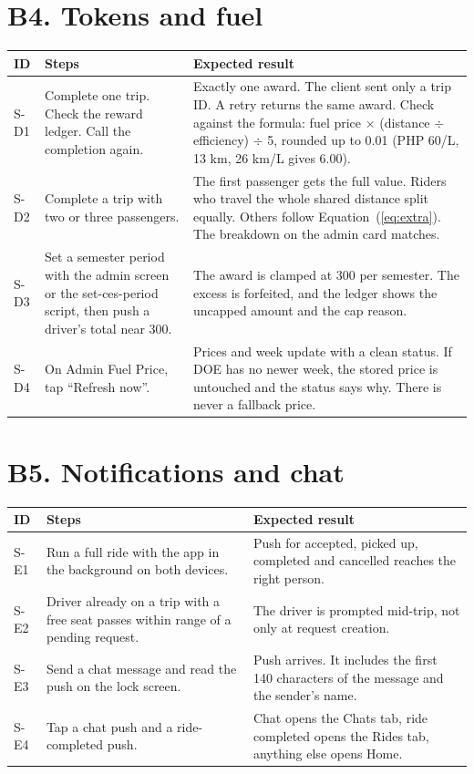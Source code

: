 \section*{B4. Tokens and fuel}
\small
\begin{longtable}{|p{1.1cm}|p{6.6cm}|p{6.3cm}|}
\hline
\textbf{ID} & \textbf{Steps} & \textbf{Expected result} \\
\hline
\endhead
S-D1 & Complete one trip. Check the reward ledger. Call the completion again. & Exactly one award. The client sent only a trip ID. A retry returns the same award. Check against the formula: fuel price $\times$ (distance $\div$ efficiency) $\div$ 5, rounded up to 0.01 (PHP 60/L, 13 km, 26 km/L gives 6.00). \\
\hline
S-D2 & Complete a trip with two or three passengers. & The first passenger gets the full value. Riders who travel the whole shared distance split equally. Others follow Equation~(\ref{eq:extra}). The breakdown on the admin card matches. \\
\hline
S-D3 & Set a semester period with the admin screen or the set-ces-period script, then push a driver’s total near 300. & The award is clamped at 300 per semester. The excess is forfeited, and the ledger shows the uncapped amount and the cap reason. \\
\hline
S-D4 & On Admin Fuel Price, tap “Refresh now”. & Prices and week update with a clean status. If DOE has no newer week, the stored price is untouched and the status says why. There is never a fallback price. \\
\hline
\end{longtable}
\normalsize

\section*{B5. Notifications and chat}
\small
\begin{longtable}{|p{1.1cm}|p{6.6cm}|p{6.3cm}|}
\hline
\textbf{ID} & \textbf{Steps} & \textbf{Expected result} \\
\hline
\endhead
S-E1 & Run a full ride with the app in the background on both devices. & Push for accepted, picked up, completed and cancelled reaches the right person. \\
\hline
S-E2 & Driver already on a trip with a free seat passes within range of a pending request. & The driver is prompted mid-trip, not only at request creation. \\
\hline
S-E3 & Send a chat message and read the push on the lock screen. & Push arrives. It includes the first 140 characters of the message and the sender’s name. \\
\hline
S-E4 & Tap a chat push and a ride-completed push. & Chat opens the Chats tab, ride completed opens the Rides tab, anything else opens Home. \\
\hline
\end{longtable}
\normalsize

